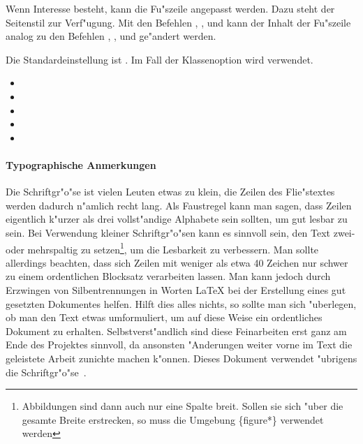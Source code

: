 \documentclass[twoside,colorback,accentcolor=tud4c,11pt]{tudreport}
\begin{document}
    Wenn Interesse besteht, kann die Fu"szeile angepasst werden. Dazu steht der Seitenstil
     zur Verf"ugung. Mit den Befehlen , , 
    und  kann der Inhalt der Fu"szeile analog zu den
    Befehlen , ,
     und  ge"andert
    werden.

    Die Standardeinstellung ist . Im Fall der Klassenoption 
    wird  verwendet.
    \begin{itemize}\itemsep-1ex
      \item {}
      \item {}
      \item {}
      \item {}
      \item{}
    \end{itemize}
    
    \paragraph{Typographische Anmerkungen}
    Die Schriftgr"o"se \textaccent{9.5pt} ist vielen Leuten etwas zu klein,
    die Zeilen des Flie"stextes werden dadurch n"amlich recht lang.
    Als Faustregel kann man sagen, dass Zeilen eigentlich k"urzer als drei
    vollst"andige Alphabete sein sollten, um gut
    lesbar zu sein. Bei Verwendung kleiner Schriftgr"o"sen kann es sinnvoll
    sein, den Text zwei- oder mehrspaltig zu setzen\footnote{Abbildungen sind
    dann auch nur eine Spalte breit. Sollen sie sich "uber die gesamte Breite
    erstrecken, so muss die Umgebung \{figure*\} verwendet
    werden}, um die Lesbarkeit zu
    verbessern. Man sollte allerdings beachten, dass sich Zeilen mit weniger 
    als etwa 40 Zeichen nur schwer zu einem ordentlichen Blocksatz verarbeiten
    lassen. Man kann jedoch durch Erzwingen von Silbentrennungen in
    Worten \LaTeX{} bei der Erstellung eines gut gesetzten Dokumentes helfen.
    Hilft dies alles nichts, so sollte man sich "uberlegen, ob man den
    Text etwas umformuliert, um auf diese Weise ein ordentliches Dokument zu
    erhalten. Selbstverst"andlich sind diese Feinarbeiten erst ganz am Ende
    des Projektes sinnvoll, da ansonsten "Anderungen weiter vorne im Text die
    geleistete Arbeit zunichte machen k"onnen. Dieses Dokument verwendet "ubrigens die
    Schriftgr"o"se~.
\end{document}
